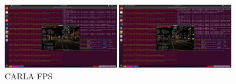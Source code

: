 \begin{figure}[htbp]
	\centerline{\includegraphics[width=0.45\textwidth,trim={22.5cm 10.5cm 22.5cm 12cm},clip]{resources/chapter-4/CARLA-5FPS.JPG}}
	\centerline{\includegraphics[width=0.45\textwidth,trim={22.5cm 10.5cm 22.5cm 12cm},clip]{resources/chapter-4/CARLA-13FPS.JPG}}
	\caption{CARLA FPS}
	\label{fig-section-5-carla-fps}
\end{figure}